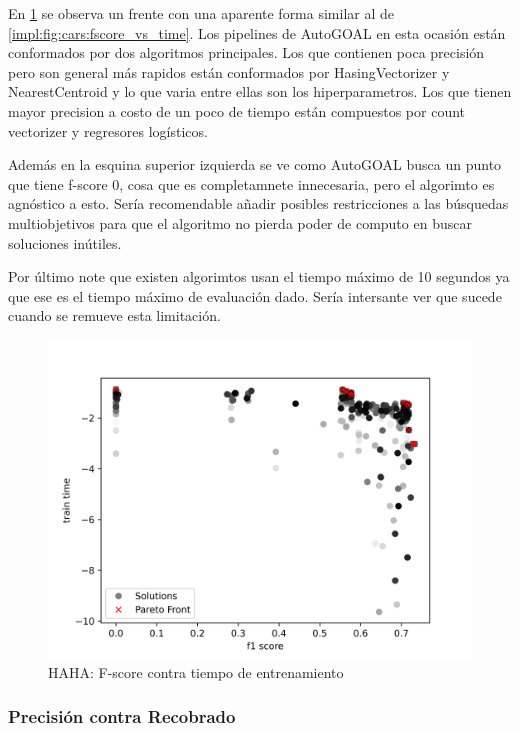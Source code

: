 En \ref{impl:fig:haha:fscore_vs_time} se observa un frente con una aparente forma similar al de \ref{impl:fig:cars:fscore_vs_time}. Los pipelines de AutoGOAL en esta ocasi\'on est\'an conformados por dos algoritmos principales. Los que contienen poca precisi\'on pero son general m\'as rapidos est\'an conformados por HasingVectorizer y NearestCentroid y  lo que varia entre ellas son los hiperparametros. Los que tienen mayor precision a costo de un poco de tiempo est\'an compuestos por count vectorizer  y regresores log\'isticos.

Adem\'as en la esquina superior izquierda se ve como AutoGOAL busca un punto que tiene f-score 0, cosa que es completamnete innecesaria, pero el algorimto es agn\'ostico a esto. Ser\'ia recomendable añadir posibles restricciones a las b\'usquedas multiobjetivos para que el algoritmo no pierda poder de computo en buscar soluciones in\'utiles.

Por \'ultimo note que existen algorimtos usan el tiempo m\'aximo de 10 segundos ya que ese es el tiempo m\'aximo de evaluaci\'on dado. Ser\'ia intersante ver que sucede cuando se remueve esta limitaci\'on.

\begin{figure}[ht]
    \includegraphics[width=\linewidth]{Pictures/haha_fscore_vs_time.jpg}
    \caption{HAHA: F-score contra tiempo de entrenamiento}
    \label{impl:fig:haha:fscore_vs_time}
\end{figure}
\subsubsection{Precisi\'on contra Recobrado}

